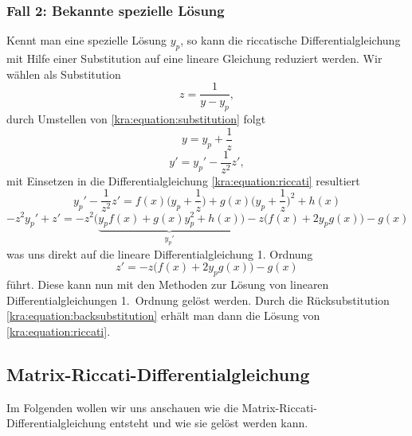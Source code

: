 \subsubsection{Fall 2: Bekannte spezielle Lösung}
Kennt man eine spezielle Lösung $y_p$, so kann die riccatische
Differentialgleichung mit Hilfe einer Substitution auf eine lineare
Gleichung reduziert werden.
Wir wählen als Substitution
\begin{equation} \label{kra:equation:substitution}
    z = \frac{1}{y - y_p},
\end{equation}
durch Umstellen von \eqref{kra:equation:substitution} folgt
\begin{equation}
    y = y_p + \frac{1}{z}
\label{kra:equation:backsubstitution}
\end{equation}
\begin{equation}
    y' = y_p' - \frac{1}{z^2}z',
\end{equation}
mit Einsetzen in die Differentialgleichung \eqref{kra:equation:riccati}
resultiert
\begin{equation}
y_p' - \frac{1}{z^2}z'
=
f(x)\biggl(y_p + \frac{1}{z}\biggr)
+
g(x)\biggl(y_p + \frac{1}{z}\biggr)^2 + h(x)
\end{equation}
\begin{equation}
-z^{2}y_p' + z'
=
-z^2\bigl(\underbrace{y_{p}f(x) + g(x)y_p^2 + h(x)}_{\displaystyle y_p'}\bigr)
-
z\bigl(f(x) + 2y_{p}g(x)\bigr) - g(x)
\end{equation}
was uns direkt auf die lineare Differentialgleichung 1. Ordnung
\begin{equation}
z'
=
-z\bigl(f(x) + 2y_{p}g(x)\bigr) - g(x)
\end{equation}
führt.
Diese kann nun mit den Methoden zur Lösung von linearen
Differentialgleichungen 1.~Ordnung gelöst werden.
Durch die Rücksubstitution \eqref{kra:equation:backsubstitution}
erhält man dann die Lösung von \eqref{kra:equation:riccati}.

\subsection{Matrix-Riccati-Differentialgleichung}
\label{kra:loesung:riccati}
Im Folgenden wollen wir uns anschauen wie die
Matrix-Riccati-Differentialgleichung entsteht und wie sie gelöst werden kann.

